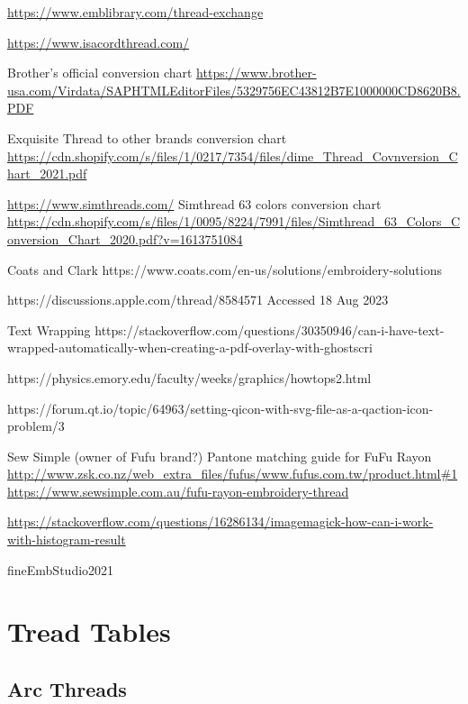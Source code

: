 \documentclass[11pt]{report}
\begin{document}
\url{https://www.emblibrary.com/thread-exchange}

\url{https://www.isacordthread.com/}

Brother's official conversion chart
\url{https://www.brother-usa.com/Virdata/SAPHTMLEditorFiles/5329756EC43812B7E1000000CD8620B8.PDF}

Exquisite Thread to other brands conversion chart
\url{https://cdn.shopify.com/s/files/1/0217/7354/files/dime_Thread_Covnversion_Chart_2021.pdf}

\url{https://www.simthreads.com/}
Simthread 63 colors conversion chart
\url{https://cdn.shopify.com/s/files/1/0095/8224/7991/files/Simthread_63_Colors_Conversion_Chart_2020.pdf?v=1613751084}

Coats and Clark https://www.coats.com/en-us/solutions/embroidery-solutions

https://discussions.apple.com/thread/8584571 Accessed 18 Aug 2023

Text Wrapping
https://stackoverflow.com/questions/30350946/can-i-have-text-wrapped-automatically-when-creating-a-pdf-overlay-with-ghostscri

https://physics.emory.edu/faculty/weeks/graphics/howtops2.html

https://forum.qt.io/topic/64963/setting-qicon-with-svg-file-as-a-qaction-icon-problem/3

Sew Simple (owner of Fufu brand?) Pantone matching guide for FuFu Rayon
\url{http://www.zsk.co.nz/web_extra_files/fufus/www.fufus.com.tw/product.html#1}
\url{https://www.sewsimple.com.au/fufu-rayon-embroidery-thread}

\url{https://stackoverflow.com/questions/16286134/imagemagick-how-can-i-work-with-histogram-result}

fineEmbStudio2021




\appendix

\chapter{Tread Tables}

\section{Arc Threads}

%

%
\end{document}

